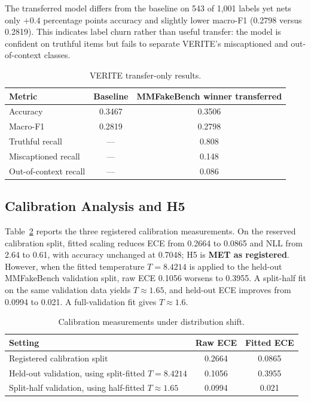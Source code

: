 \documentclass{article} %
\begin{document}
The transferred model differs from the baseline on 543 of 1,001 labels yet nets only \(+0.4\) percentage points accuracy and slightly lower macro-F1 (0.2798 versus 0.2819). This indicates label churn rather than useful transfer: the model is confident on truthful items but fails to separate VERITE's miscaptioned and out-of-context classes.

\begin{table}[t]
\centering
\small
\caption{VERITE transfer-only results.}
\label{tab:verite}
\begin{tabular}{lcc}
\toprule
Metric & Baseline & MMFakeBench winner transferred \\
\midrule
Accuracy & 0.3467 & 0.3506 \\
Macro-F1 & 0.2819 & 0.2798 \\
Truthful recall & --- & 0.808 \\
Miscaptioned recall & --- & 0.148 \\
Out-of-context recall & --- & 0.086 \\
\bottomrule
\end{tabular}
\end{table}

\subsection{Calibration Analysis and H5}
Table~\ref{tab:calib} reports the three registered calibration measurements. On the reserved calibration split, fitted scaling reduces ECE from 0.2664 to 0.0865 and NLL from 2.64 to 0.61, with accuracy unchanged at 0.7048; H5 is \textbf{MET as registered}. However, when the fitted temperature \(T=8.4214\) is applied to the held-out MMFakeBench validation split, raw ECE 0.1056 worsens to 0.3955. A split-half fit on the same validation data yields \(T\approx1.65\), and held-out ECE improves from 0.0994 to 0.021. A full-validation fit gives \(T\approx1.6\).

\begin{table}[t]
\centering
\small
\caption{Calibration measurements under distribution shift.}
\label{tab:calib}
\begin{tabular}{lcc}
\toprule
Setting & Raw ECE & Fitted ECE \\
\midrule
Registered calibration split & 0.2664 & 0.0865 \\
Held-out validation, using split-fitted \(T=8.4214\) & 0.1056 & 0.3955 \\
Split-half validation, using half-fitted \(T\approx1.65\) & 0.0994 & 0.021 \\
\bottomrule
\end{tabular}
\end{table}
\end{document}
